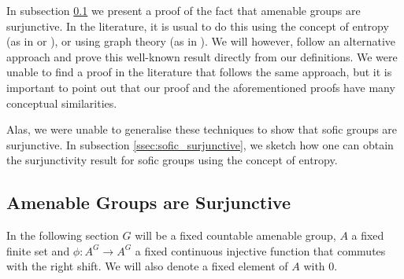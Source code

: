 \documentclass[titlepage, a4paper]{article}
\theoremstyle{remark}
\begin{document}
In subsection \ref{ssec:amenable_surjunctive} we present a proof of the fact that amenable groups are surjunctive. In the literature, it is usual to do this using the concept of entropy (as in \cite[section 4]{kerr_li_2010} or \cite[subsection 2.13]{capraro_lupini_2015}), or using graph theory (as in \cite[section 3]{weiss_2000}). We will however, follow an alternative approach and prove this well-known result directly from our definitions. We were unable to find a proof in the literature that follows the same approach, but it is important to point out that our proof and the aforementioned proofs have many conceptual similarities. 

Alas, we were unable to generalise these techniques to show that sofic groups are surjunctive. In subsection \ref{ssec:sofic_surjunctive}, we sketch how one can obtain the surjunctivity result for sofic groups using the concept of entropy.


\subsection{Amenable Groups are Surjunctive} \label{ssec:amenable_surjunctive}
In the following section $G$ will be a fixed countable amenable group, $A$ a fixed finite set and $\phi: A^{G} \to A^{G}$ a fixed continuous injective function that commutes with the right shift. 
We will also denote a fixed element of $A$ with $0$.
\end{document}

